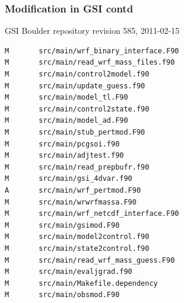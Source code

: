\documentclass[10pt]{beamer}
\begin{document}

\begin{frame}[fragile]
\frametitle{Modification in GSI contd}
GSI Boulder repository revision 585, 2011-02-15
\begin{beamerboxesrounded}[ lower=postit,shadow=true]{}
{\tiny
\begin{verbatim}
M       src/main/wrf_binary_interface.F90
M       src/main/read_wrf_mass_files.f90
M       src/main/control2model.f90
M       src/main/update_guess.f90
M       src/main/model_tl.F90
M       src/main/control2state.f90
M       src/main/model_ad.F90
M       src/main/stub_pertmod.F90
M       src/main/pcgsoi.f90
M       src/main/adjtest.f90
M       src/main/read_prepbufr.f90
M       src/main/gsi_4dvar.f90
A       src/main/wrf_pertmod.F90
M       src/main/wrwrfmassa.F90
M       src/main/wrf_netcdf_interface.F90
M       src/main/gsimod.F90
M       src/main/model2control.f90
M       src/main/state2control.f90
M       src/main/read_wrf_mass_guess.F90
M       src/main/evaljgrad.f90
M       src/main/Makefile.dependency
M       src/main/obsmod.F90
\end{verbatim}
}
\end{beamerboxesrounded}
\end{frame}
\end{document}
